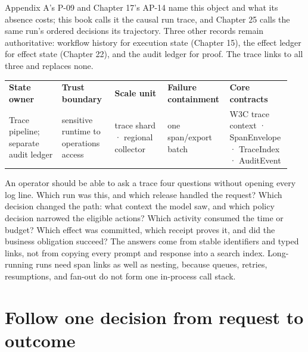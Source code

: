 Appendix A's P-09 and Chapter 17's AP-14 name this object and what its absence costs; this book calls it the causal run trace, and Chapter 25 calls the same run's ordered decisions its trajectory. Three other records remain authoritative: workflow history for execution state (Chapter 15), the effect ledger for effect state (Chapter 22), and the audit ledger for proof. The trace links to all three and replaces none.\par


\BookTableStart
\fontsize{7.2}{9}\selectfont
\begin{tabular}{@{}Y{0.1880\linewidth}Y{0.1880\linewidth}Y{0.1880\linewidth}Y{0.1880\linewidth}Y{0.1880\linewidth}@{}}
\color{white}\bfseries \textbf{State owner} & \color{white}\bfseries \textbf{Trust boundary} & \color{white}\bfseries \textbf{Scale unit} & \color{white}\bfseries \textbf{Failure containment} & \color{white}\bfseries \textbf{Core contracts} \\
Trace pipeline; separate audit ledger & sensitive runtime to operations access & trace shard · regional collector & one span/export batch & W3C trace context · SpanEnvelope · TraceIndex · AuditEvent \\
\end{tabular}
\BookTableEnd

An operator should be able to ask a trace four questions without opening every log line. Which run was this, and which release handled the request? Which decision changed the path: what context the model saw, and which policy decision narrowed the eligible actions? Which activity consumed the time or budget? Which effect was committed, which receipt proves it, and did the business obligation succeed? The answers come from stable identifiers and typed links, not from copying every prompt and response into a search index. Long-running runs need span links as well as nesting, because queues, retries, resumptions, and fan-out do not form one in-process call stack.\par

\section{Follow one decision from request to outcome}

